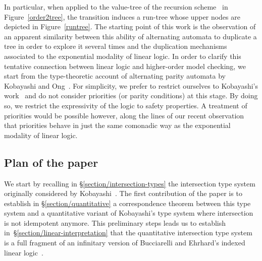 \documentclass{eptcs}
\begin{document}
In particular, when applied to the value-tree of the recursion scheme~ in Figure~\ref{order2tree},
the transition induces a run-tree whose upper nodes are depicted in Figure~\ref{runtree}.
The starting point of this work is the observation of an apparent similarity between this ability 
of alternating automata to duplicate a tree in order to explore it several times 
and the duplication mechanisms associated to the exponential modality of linear logic.
In order to clarify this tentative connection between linear logic and higher-order model checking,
we start from the type-theoretic account of alternating parity automata by Kobayashi and Ong~\cite{kobayashi-ong}.
For simplicity, we prefer to restrict ourselves to Kobayashi's work~\cite{koba09} and do not consider priorities
(or parity conditions) at this stage.
By doing so, we restrict the expressivity of the logic to safety properties.
A treatment of priorities would be possible however, along the lines of our recent observation~\cite{tensorial-logic-with-colours}
that priorities behave in just the same comonadic way as the exponential modality of linear logic.


\subsection*{Plan of the paper}
We start by recalling in \S\ref{section/intersection-types} the intersection type system originally considered by Kobayashi~\cite{koba09}.
The first contribution of the paper is to establish in \S\ref{section/quantitative} a correspondence theorem 
between this type system and a quantitative variant of Kobayashi's type system where intersection is not idempotent anymore.
This preliminary steps leads us to establish in~\S\ref{section/linear-interpretation}
that the quantitative intersection type system is a full fragment of an infinitary version 
of Bucciarelli and Ehrhard's indexed linear logic~\cite{ill1,ill2}.
\end{document}
